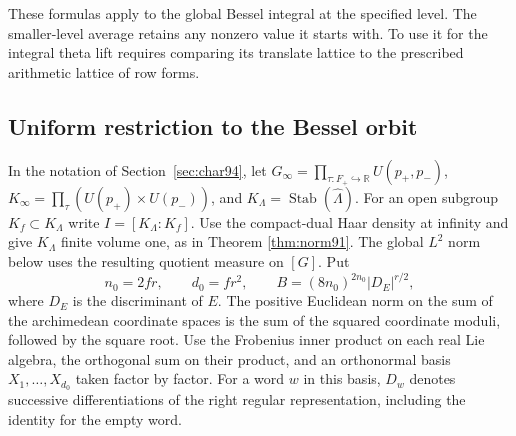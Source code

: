 \documentclass[a4paper,11pt]{article}
\theoremstyle{definition}
\theoremstyle{remark}
\newcommand{\RR}{\mathbb R}\newcommand{\CC}{\mathbb C}\newcommand{\QQ}{\mathbb Q}
\numberwithin{equation}{section}
\begin{document}
These formulas apply to the global Bessel integral at the specified
level. The smaller-level average retains any nonzero value it starts
with. To use it for the integral theta lift requires comparing its
translate lattice to the prescribed arithmetic lattice of row forms.

\subsection{Uniform restriction to the Bessel orbit}\label{nav:VI-09}
\label{sec:restrict96}

In the notation of Section~\ref{sec:char94}, let
\(G_\infty=\prod_{\tau:F_+\hookrightarrow\RR}U(p_+,p_-)\),
\(K_\infty=\prod_\tau(U(p_+)\times U(p_-))\), and
\(K_\Lambda=\operatorname{Stab}(\widehat\Lambda)\).
For an open subgroup \(K_f\subset K_\Lambda\) write \(I=[K_\Lambda:K_f]\).
Use the compact-dual Haar density at infinity and give \(K_\Lambda\)
finite volume one, as in Theorem \ref{thm:norm91}. The global \(L^2\)
norm below uses the resulting quotient measure on \([G]\). Put
\[
 n_0=2fr,\qquad d_0=fr^2,\qquad
 B=(8n_0)^{2n_0}|D_E|^{r/2},
\]
where \(D_E\) is the discriminant of \(E\). The positive Euclidean
norm on the sum of the archimedean coordinate spaces is the sum of
the squared coordinate moduli, followed by the square root.
Use the Frobenius inner product on each real Lie algebra, the
orthogonal sum on their product, and an orthonormal basis
\(X_1,\ldots,X_{d_0}\) taken factor by factor. For a word \(w\)
in this basis, \(D_w\) denotes successive differentiations of the
right regular representation, including the identity for the
empty word.
\end{document}
